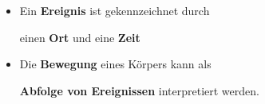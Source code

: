 \documentclass[]{beamer}%
\begin{document}
\begin{frame}
    \begin{itemize}
        \item Ein \textbf{Ereignis} ist gekennzeichnet durch\\
            \begin{center}
                einen \textbf{Ort} und eine \textbf{Zeit}
            \end{center}
    \end{itemize}
\end{frame}

\begin{frame}
    \begin{itemize}
        \item Die \textbf{Bewegung} eines Körpers kann als\\
            \begin{center}
                \textbf{Abfolge von Ereignissen} interpretiert werden.
            \end{center}
    \end{itemize}
\end{frame}
\end{document}
